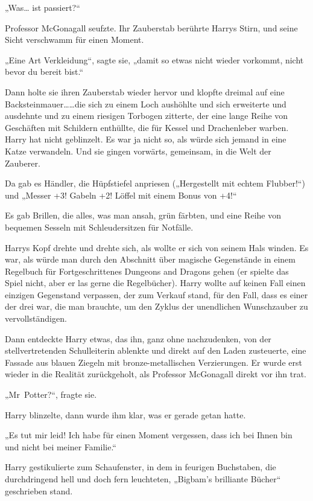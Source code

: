 {„Was… ist passiert?“

Professor McGonagall seufzte. Ihr Zauberstab berührte Harrys Stirn, und seine Sicht verschwamm für einen Moment.

„Eine Art Verkleidung“, sagte sie, „damit so etwas nicht wieder vorkommt, nicht bevor du bereit bist.“

Dann holte sie ihren Zauberstab wieder hervor und klopfte dreimal auf eine Backsteinmauer……die sich zu einem Loch aushöhlte und sich erweiterte und ausdehnte und zu einem riesigen Torbogen zitterte, der eine lange Reihe von Geschäften mit Schildern enthüllte, die für Kessel und Drachenleber warben. Harry hat nicht geblinzelt. Es war ja nicht so, als würde sich jemand in eine Katze verwandeln. Und sie gingen vorwärts, gemeinsam, in die Welt der Zauberer.

Da gab es Händler, die Hüpfstiefel anpriesen („Hergestellt mit echtem Flubber!“) und „Messer +3! Gabeln +2! Löffel mit einem Bonus von +4!“

Es gab Brillen, die alles, was man ansah, grün färbten, und eine Reihe von bequemen Sesseln mit Schleudersitzen für Notfälle.

Harrys Kopf drehte und drehte sich, als wollte er sich von seinem Hals winden. Es war, als würde man durch den Abschnitt über magische Gegenstände in einem Regelbuch für Fortgeschrittenes Dungeons and Dragons gehen (er spielte das Spiel nicht, aber er las gerne die Regelbücher). Harry wollte auf keinen Fall einen einzigen Gegenstand verpassen, der zum Verkauf stand, für den Fall, dass es einer der drei war, die man brauchte, um den Zyklus der unendlichen Wunschzauber zu vervollständigen.

Dann entdeckte Harry etwas, das ihn, ganz ohne nachzudenken, von der stellvertretenden Schulleiterin ablenkte und direkt auf den Laden zusteuerte, eine Fassade aus blauen Ziegeln mit bronze-metallischen Verzierungen. Er wurde erst wieder in die Realität zurückgeholt, als Professor McGonagall direkt vor ihn trat.

„Mr~Potter?“, fragte sie.

Harry blinzelte, dann wurde ihm klar, was er gerade getan hatte.

„Es tut mir leid! Ich habe für einen Moment vergessen, dass ich bei Ihnen bin und nicht bei meiner Familie.“

Harry gestikulierte zum Schaufenster, in dem in feurigen Buchstaben, die durchdringend hell und doch fern leuchteten, „Bigbam's brilliante Bücher“ geschrieben stand.

}
